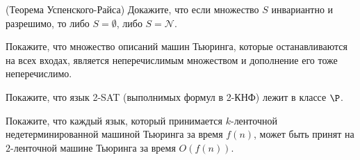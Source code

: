 \begin{task}
   (Теорема Успенского-Райса) Докажите, что если множество $S$ инвариантно и разрешимо, то либо $S = \emptyset$, либо $S =
   \mathcal{N}$.
\end{task}

\begin{task}
   Покажите, что множество описаний машин Тьюринга, которые останавливаются на всех входах, является неперечислимым множеством и
   дополнение его тоже неперечислимо.
\end{task}

\begin{task}
	Покажите, что язык 2-SAT (выполнимых формул в 2-КНФ) лежит в классе $\P$. 
\end{task}


\breakline

\begin{ptask}{8}
    Покажите, что каждый язык, который принимается $k$-ленточной недетерминированной машиной Тьюринга за время $f(n)$, может быть
    принят на $2$-ленточной машине Тьюринга за время $O(f(n))$.
\end{ptask}